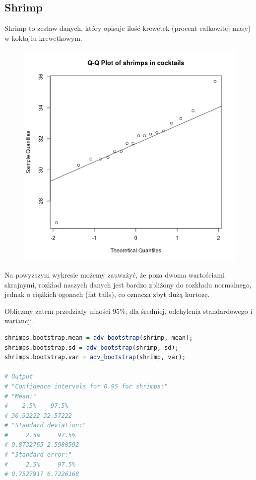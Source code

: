 \documentclass[11pt]{article}
\begin{document}
\pagebreak

\subsection{Shrimp}
Shrimp to zestaw danych, który opisuje ilość krewetek (procent całkowitej masy)
w koktajlu krewetkowym.

\begin{figure}[h]
\includegraphics[scale=0.5]{shrimps_qq.png}
\centering
\end{figure}

Na powyższym wykresie możemy zauważyć, że poza dwoma wartościami skrajnymi,
rozkład naszych danych jest bardzo zbliżony do rozkładu normalnego, jednak
o ciężkich ogonach (fat tails), co oznacza zbyt dużą kurtozę.

Obliczmy zatem przedziały ufności 95\%, dla średniej, odchylenia standardowego i wariancji.

\begin{lstlisting}[language=R]
shrimps.bootstrap.mean = adv_bootstrap(shrimp, mean);
shrimps.bootstrap.sd = adv_bootstrap(shrimp, sd);
shrimps.bootstrap.var = adv_bootstrap(shrimp, var);

# Output
# "Confidence intervals for 0.95 for shrimps:"
# "Mean:"
#    2.5%    97.5% 
# 30.92222 32.57222 
# "Standard deviation:"
#     2.5%     97.5% 
# 0.8732765 2.5980592 
# "Standard error:"
#     2.5%     97.5% 
# 0.7527917 6.7226168 
\end{lstlisting}
\end{document}
